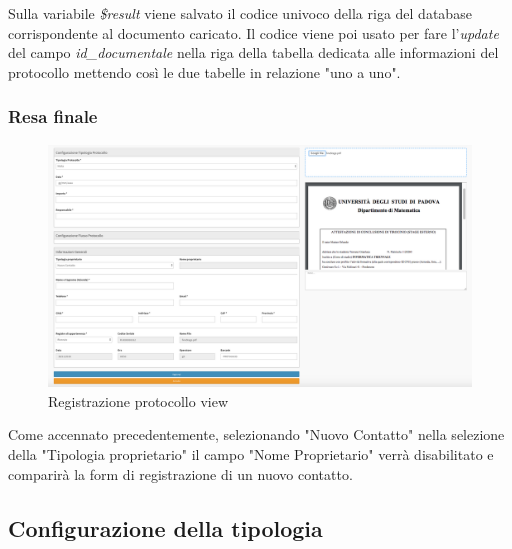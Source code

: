         Sulla variabile \textit{\$result} viene salvato il codice univoco della riga del database corrispondente al documento caricato. Il codice viene poi usato per fare l'\textit{update} del campo \textit{id\_documentale} nella riga della tabella dedicata alle informazioni del protocollo mettendo così le due tabelle in relazione "uno a uno".
    \subsubsection{Resa finale}
        \begin{figure}[!h] 
            \centering 
            \includegraphics[width=\textwidth]{immagini/prodottofinito/regproto.png}
            \caption{Registrazione protocollo view}
        \end{figure}
        Come accennato precedentemente, selezionando "Nuovo Contatto" nella selezione della "Tipologia proprietario" il campo "Nome Proprietario" verrà disabilitato e comparirà la form di registrazione di un nuovo contatto.
        
\subsection{Configurazione della tipologia}
